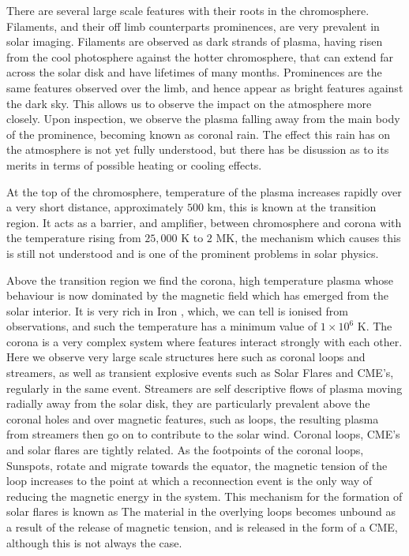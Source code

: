 There are several large scale features with their roots in the chromosphere.
Filaments, and their off limb counterparts prominences, are very prevalent in solar imaging.
Filaments are observed as dark strands of plasma, having risen from the cool photosphere against the hotter chromosphere, that can extend far across the solar disk and have lifetimes of many months.
Prominences are the same features observed over the limb, and hence appear as bright features against the dark sky.
This allows us to observe the impact on the atmosphere more closely. 
Upon inspection, we observe the plasma falling away from the main body of the prominence, becoming known as coronal rain.
The effect this rain has on the atmosphere is not yet fully understood, but there has be disussion as to its merits in terms of possible heating or cooling effects.

At the top of the chromosphere, temperature of the plasma increases rapidly over a very short distance, approximately $500$ km, this is known at the transition region.
It acts as a barrier, and amplifier, between chromosphere and corona with the temperature rising from $25,000$ K to $2$ MK, the mechanism which causes this is still not understood and is one of the prominent problems in solar physics.

Above the transition region we find the corona, high temperature plasma whose behaviour is now dominated by the magnetic field which has emerged from the solar interior.
It is very rich in Iron , which, we can tell is ionised from observations, and such the temperature has a minimum value of $1 \times 10^6$ K.
The corona is a very complex system where features interact strongly with each other.
Here we observe very large scale structures here such as coronal loops and streamers, as well as transient explosive events such as Solar Flares and CME's, regularly in the same event.
Streamers are self descriptive flows of plasma moving radially away from the solar disk, they are particularly prevalent above the coronal holes and over magnetic features, such as loops, the resulting plasma from streamers then go on to contribute to the solar wind.
Coronal loops, CME's and solar flares are tightly related.
As the footpoints of the coronal loops, Sunspots, rotate and migrate towards the equator, the magnetic tension of the loop increases to the point at which a reconnection event is the only way of reducing the magnetic energy in the system.
This mechanism for the formation of solar flares is known as 
The material in the overlying loops becomes unbound as a result of the release of magnetic tension, and is released in the form of a CME, although this is not always the case.

